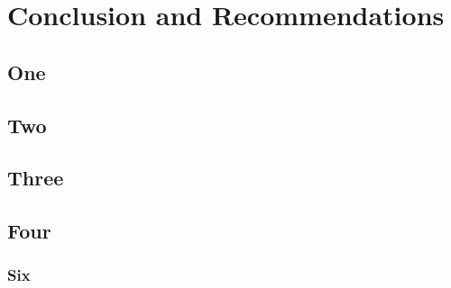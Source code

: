 
\chapter{Conclusion and Recommendations}
\begin{spacing}{1.5}
\setlength{\parskip}{0.3in}

\section{One}

\section{Two}

\section{Three}

\section{Four}

\subsection{Six}


\end{spacing}
\newpage
